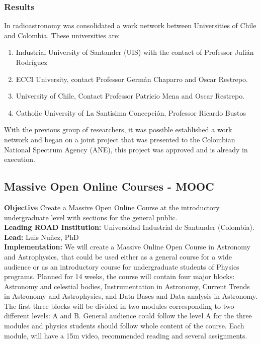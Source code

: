 \subsubsection{Results}
In radioastronomy was consolidated a work network between Universities of Chile and Colombia.
These universities are: 
\begin{enumerate}
    \item Industrial University of Santander (UIS) with the contact of
      Professor Julián Rodríguez 
    \item ECCI University, contact Professor Germán Chaparro and Oscar Restrepo.
    \item University of Chile, Contact Professor Patricio Mena and
      Oscar Restrepo. 
    \item Catholic University of La Santisima Concepción, Professor
      Ricardo Bustos 
\end{enumerate}

With the previous group of researchers, it was possible established a
work network and began on a joint project that was presented to the
Colombian National Spectrum Agency (ANE), this project was approved and is
already in execution. 








\subsection{Massive Open Online Courses - MOOC}
\textbf{Objective} Create a Massive Open Online Course at the
introductory undergraduate level with sections for the general
public. \\
\textbf{Leading ROAD Institution:} Universidad Industrial de Santander
(Colombia). \\
\textbf{Lead: }Luis Nuñez, PhD  \\
\textbf{Implementation:} We will create a Massive Online Open Course
in Astronomy and Astrophysics, that could be used either as a general
course for a wide audience or as an introductory course for
undergraduate students of Physics programs. Planned for 14 weeks, the
course will contain four major blocks: Astronomy and celestial bodies,
Instrumentation in Astronomy, Current Trends in Astronomy and
Astrophysics, and Data Bases and Data analysis in Astronomy. The first
three blocks will be divided in two modules corresponding to two
different levels: A and B. General audience could follow the level A
for the three modules and physics students should follow whole content
of the course. 
Each module, will have a 15m video, recommended reading and several
assignments. 
\\ 

